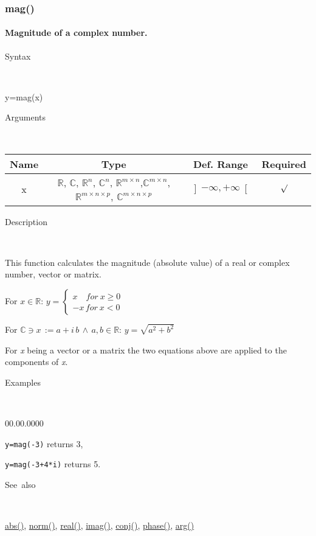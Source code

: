 \newpage
\subsubsection*{\hypertarget{mag}{}{\Large mag()}}


\paragraph{\label{par:Magnitude}Magnitude of a complex number.}

\begin{description}
\item [Syntax]~
\end{description}
y=mag(x)

\begin{description}
\item [Arguments]~
\end{description}
\begin{tabular}{|c|c|c|c|}
\hline 
Name&
Type&
Def. Range&
Required\tabularnewline
\hline
\hline 
x&
$\mathbb{R}$, $\mathbb{C}$, $\mathbb{R}^{n}$, $\mathbb{C}^{n}$,
$\mathbb{\mathbb{R}}^{m\times n}$,$\mathbb{\mathbb{C}}^{m\times n}$,
$\mathbb{\mathbb{R}}^{m\times n\times p}$, $\mathbb{\mathbb{C}}^{m\times n\times p}$ &
$\left]-\infty,+\infty\right[$&
$\surd$\tabularnewline
\hline
\end{tabular}

\begin{description}
\item [Description]~
\end{description}
This function calculates the magnitude (absolute value) of a real
or complex number, vector or matrix.

\medskip{}
For $x\in\mathbb{R}$: $y=\left\{ \begin{array}{l}
x\quad for\: x\geq0\\
-x\, for\: x<0\end{array}\right.$
\medskip{}

For $\mathbb{\mathbb{C}}\ni x\,:=a+i\, b\,\wedge\, a,b\in\mathbb{R}$:
$y=\sqrt{a^{2}+b^{2}}$
\medskip{}

For \textit{x} being a vector or a matrix the two equations above
are applied to the components of \textit{x}.

\begin{description}
\item [Examples]~
\end{description}
\begin{lyxlist}{00.00.0000}
\item [\texttt{y=mag(-3)}]returns 3,
\item [\texttt{y=mag(-3+4{*}i)}]returns 5.
\end{lyxlist}
\begin{description}
\item [See~also]~
\end{description}
\textcolor{blue}{\hyperlink{abs}{abs()}}, \textcolor{blue}{\hyperlink{norm}{norm()}},
\textcolor{blue}{\hyperlink{real}{real()}}, \textcolor{blue}{\hyperlink{imag}{imag()}},
\textcolor{blue}{\hyperlink{conj}{conj()}}, \textcolor{blue}{\hyperlink{phase}{phase()}},
\textcolor{blue}{\hyperlink{arg}{arg()}}


